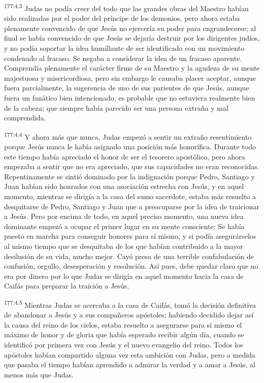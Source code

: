 \par 
\textsuperscript{177:4.3} Judas no podía creer del todo que las grandes obras del Maestro habían sido realizadas por el poder del príncipe de los demonios, pero ahora estaba plenamente convencido de que Jesús no ejercería su poder para engrandecerse; al final se había convencido de que Jesús se dejaría destruir por los dirigentes judíos, y no podía soportar la idea humillante de ser identificado con un movimiento condenado al fracaso. Se negaba a considerar la idea de un fracaso aparente. Comprendía plenamente el carácter firme de su Maestro y la agudeza de su mente majestuosa y misericordiosa, pero sin embargo le causaba placer aceptar, aunque fuera parcialmente, la sugerencia de uno de sus parientes de que Jesús, aunque fuera un fanático bien intencionado, es probable que no estuviera realmente bien de la cabeza; que siempre había parecido ser una persona extraña y mal comprendida.

\par 
\textsuperscript{177:4.4} Y ahora más que nunca, Judas empezó a sentir un extraño resentimiento porque Jesús nunca le había asignado una posición más honorífica. Durante todo este tiempo había apreciado el honor de ser el tesorero apostólico, pero ahora empezaba a sentir que no era apreciado, que sus capacidades no eran reconocidas. Repentinamente se sintió dominado por la indignación porque Pedro, Santiago y Juan habían sido honrados con una asociación estrecha con Jesús, y en aquel momento, mientras se dirigía a la casa del sumo sacerdote, estaba más resuelto a desquitarse de Pedro, Santiago y Juan que a preocuparse por la idea de traicionar a Jesús. Pero por encima de todo, en aquel preciso momento, una nueva idea dominante empezó a ocupar el primer lugar en su mente consciente: Se había puesto en marcha para conseguir honores para sí mismo, y si podía asegurárselos al mismo tiempo que se desquitaba de los que habían contribuido a la mayor desilusión de su vida, mucho mejor. Cayó presa de una terrible confabulación de confusión, orgullo, desesperación y resolución. Así pues, debe quedar claro que no era por dinero por lo que Judas se dirigía en aquel momento hacia la casa de Caifás para preparar la traición a Jesús.

\par 
\textsuperscript{177:4.5} Mientras Judas se acercaba a la casa de Caifás, tomó la decisión definitiva de abandonar a Jesús y a sus compañeros apóstoles; habiendo decidido dejar así la causa del reino de los cielos, estaba resuelto a asegurarse para sí mismo el máximo de honor y de gloria que había esperado recibir algún día, cuando se identificó por primera vez con Jesús y el nuevo evangelio del reino. Todos los apóstoles habían compartido alguna vez esta ambición con Judas, pero a medida que pasaba el tiempo habían aprendido a admirar la verdad y a amar a Jesús, al menos más que Judas.

